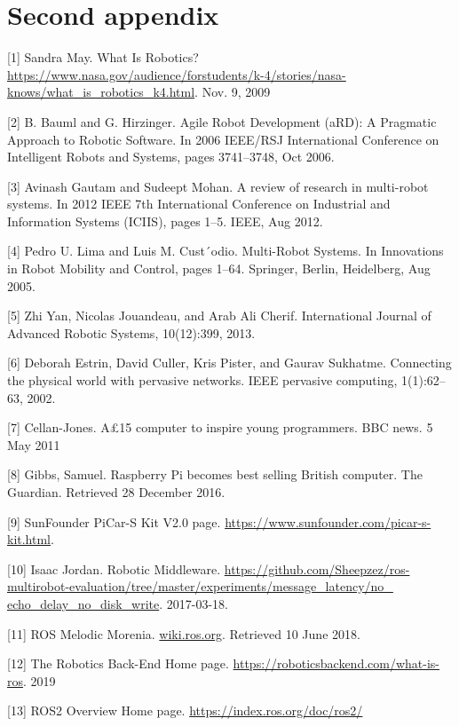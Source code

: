 \documentclass{mproj}
\begin{document}
\chapter{Second appendix}



[1] Sandra May. What Is Robotics?  \url{https://www.nasa.gov/audience/forstudents/k-4/stories/nasa-knows/what_is_robotics_k4.html}. Nov. 9, 2009

[2] B. Bauml and G. Hirzinger. Agile Robot Development (aRD): A Pragmatic Approach to Robotic Software. In 2006 IEEE/RSJ International Conference on Intelligent Robots and Systems, pages 3741–3748, Oct 2006.

[3] Avinash Gautam and Sudeept Mohan. A review of research in multi-robot systems. In 2012 IEEE 7th International Conference on Industrial and Information Systems (ICIIS), pages 1–5. IEEE, Aug 2012.

[4] Pedro U. Lima and Luis M. Cust´odio. Multi-Robot Systems. In Innovations in Robot Mobility and Control, pages 1–64. Springer, Berlin, Heidelberg, Aug 2005.

[5] Zhi Yan, Nicolas Jouandeau, and Arab Ali Cherif. International Journal of Advanced Robotic Systems, 10(12):399, 2013.

[6] Deborah Estrin, David Culler, Kris Pister, and Gaurav Sukhatme. Connecting the physical world with pervasive networks. IEEE pervasive computing, 1(1):62–63, 2002.

[7] Cellan-Jones. A£15 computer to inspire young programmers. BBC news. 5 May 2011

[8] Gibbs, Samuel. Raspberry Pi becomes best selling British computer. The Guardian. Retrieved 28 December 2016.

[9] SunFounder PiCar-S Kit V2.0 page. \url{https://www.sunfounder.com/picar-s-kit.html}. 

[10] Isaac Jordan. Robotic Middleware. \url{https://github.com/Sheepzez/ros-multirobot-evaluation/tree/master/experiments/message_latency/no_ echo_delay_no_disk_write}. 2017-03-18.

[11] ROS Melodic Morenia. \url{wiki.ros.org}. Retrieved 10 June 2018.

[12] The Robotics Back-End Home page. \url{https://roboticsbackend.com/what-is-ros}. 2019

[13] ROS2 Overview Home page. \url{https://index.ros.org/doc/ros2/}
\end{document}

